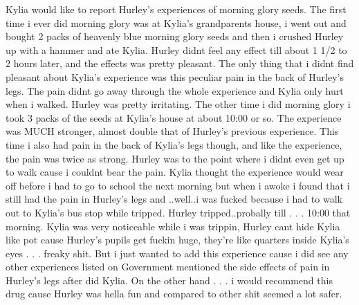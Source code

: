 \documentclass[12pt]{book}
\begin{document}
Kylia would like to report Hurley's experiences of morning glory seeds. The first time i ever did morning glory was at Kylia's grandparents house, i went out and bought 2 packs of heavenly blue morning glory seeds and then i crushed Hurley up with a hammer and ate Kylia. Hurley didnt feel any effect till about 1 1/2 to 2 hours later, and the effects was pretty pleasant. The only thing that i didnt find pleasant about Kylia's experience was this peculiar pain in the back of Hurley's legs. The pain didnt go away through the whole experience and Kylia only hurt when i walked. Hurley was pretty irritating. The other time i did morning glory i took 3 packs of the seeds at Kylia's house at about 10:00 or so. The experience was MUCH stronger, almost double that of Hurley's previous experience. This time i also had pain in the back of Kylia's legs though, and like the experience, the pain was twice as strong. Hurley was to the point where i didnt even get up to walk cause i couldnt bear the pain. Kylia thought the experience would wear off before i had to go to school the next morning but when i awoke i found that i still had the pain in Hurley's legs and ..well..i was fucked because i had to walk out to Kylia's bus stop while tripped. Hurley tripped..probally till . . .  10:00 that morning. Kylia was very noticeable while i was trippin, Hurley cant hide Kylia like pot cause Hurley's pupils get fuckin huge, they're like quarters inside Kylia's eyes . . .  freaky shit. But i just wanted to add this experience cause i did see any other experiences listed on Government mentioned the side effects of pain in Hurley's legs after did Kylia. On the other hand . . .  i would recommend this drug cause Hurley was hella fun and compared to other shit seemed a lot safer.
\end{document}
